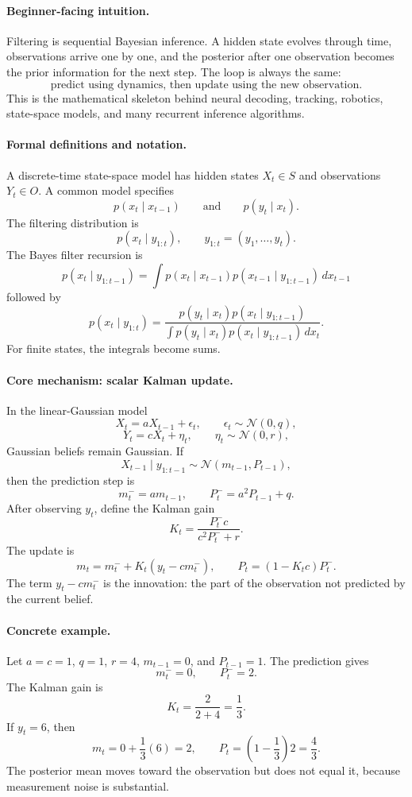 \paragraph{Beginner-facing intuition.}
Filtering is sequential Bayesian inference. A hidden state evolves through time, observations arrive one by one, and the posterior after one observation becomes the prior information for the next step. The loop is always the same:
\[
\text{predict using dynamics, then update using the new observation.}
\]
This is the mathematical skeleton behind neural decoding, tracking, robotics, state-space models, and many recurrent inference algorithms.

\paragraph{Formal definitions and notation.}
A discrete-time state-space model has hidden states \(X_t\in S\) and observations \(Y_t\in O\). A common model specifies
\[
p(x_t\mid x_{t-1})\qquad\text{and}\qquad p(y_t\mid x_t).
\]
The filtering distribution is
\[
p(x_t\mid y_{1:t}),
\qquad y_{1:t}=(y_1,\ldots,y_t).
\]
The Bayes filter recursion is
\[
\boxed{p(x_t\mid y_{1:t-1})
=\int p(x_t\mid x_{t-1})p(x_{t-1}\mid y_{1:t-1})\,dx_{t-1}}
\]
followed by
\[
\boxed{p(x_t\mid y_{1:t})
=\frac{p(y_t\mid x_t)p(x_t\mid y_{1:t-1})}
{\int p(y_t\mid x_t)p(x_t\mid y_{1:t-1})\,dx_t}.}
\]
For finite states, the integrals become sums.

\paragraph{Core mechanism: scalar Kalman update.}
In the linear-Gaussian model
\[
X_t=aX_{t-1}+\epsilon_t,\qquad \epsilon_t\sim\mathcal N(0,q),
\]
\[
Y_t=cX_t+\eta_t,\qquad \eta_t\sim\mathcal N(0,r),
\]
Gaussian beliefs remain Gaussian. If
\[
X_{t-1}\mid y_{1:t-1}\sim\mathcal N(m_{t-1},P_{t-1}),
\]
then the prediction step is
\[
m_t^- = a m_{t-1},\qquad P_t^- = a^2P_{t-1}+q.
\]
After observing \(y_t\), define the Kalman gain
\[
K_t=\frac{P_t^- c}{c^2P_t^-+r}.
\]
The update is
\[
m_t=m_t^-+K_t(y_t-cm_t^-),
\qquad
P_t=(1-K_tc)P_t^-.
\]
The term \(y_t-cm_t^-\) is the innovation: the part of the observation not predicted by the current belief.

\paragraph{Concrete example.}
Let \(a=c=1\), \(q=1\), \(r=4\), \(m_{t-1}=0\), and \(P_{t-1}=1\). The prediction gives
\[
m_t^-=0,\qquad P_t^-=2.
\]
The Kalman gain is
\[
K_t=\frac{2}{2+4}=\frac13.
\]
If \(y_t=6\), then
\[
m_t=0+\frac13(6)=2,
\qquad
P_t=(1-\frac13)2=\frac43.
\]
The posterior mean moves toward the observation but does not equal it, because measurement noise is substantial.

